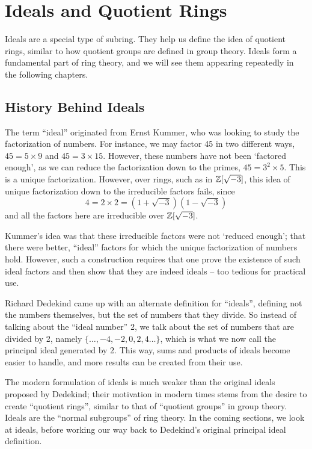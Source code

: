 \chapter{Ideals and Quotient Rings}
Ideals are a special type of subring. They help us define the idea of quotient rings, similar to how quotient groups are defined in group theory. Ideals form a fundamental part of ring theory, and we will see them appearing repeatedly in the following chapters.

\section{History Behind Ideals}
The term ``ideal'' originated from Ernst Kummer, who was looking to study the factorization of numbers. For instance, we may factor 45 in two different ways, $45 = 5 \times 9$ and $45 = 3 \times 15$. However, these numbers have not been `factored enough', as we can reduce the factorization down to the primes, $45 = 3^2 \times 5$. This is a unique factorization. However, over rings, such as in $\mathbb{Z}[\sqrt{-3}]$, this idea of unique factorization down to the irreducible factors fails, since
\[
    4 = 2 \times 2 = (1+\sqrt{-3})(1-\sqrt{-3})
\]
and all the factors here are irreducible over $\mathbb{Z}[\sqrt{-3}]$.

Kummer's idea was that these irreducible factors were not `reduced enough'; that there were better, ``ideal'' factors for which the unique factorization of numbers hold. However, such a construction requires that one prove the existence of such ideal factors and then show that they are indeed ideals -- too tedious for practical use.

Richard Dedekind came up with an alternate definition for ``ideals'', defining not the numbers themselves, but the set of numbers that they divide. So instead of talking about the ``ideal number'' 2, we talk about the set of numbers that are divided by 2, namely $\{\dots, -4, -2, 0, 2, 4 \dots\}$, which is what we now call the principal ideal generated by 2. This way, sums and products of ideals become easier to handle, and more results can be created from their use.

The modern formulation of ideals is much weaker than the original ideals proposed by Dedekind; their motivation in modern times stems from the desire to create ``quotient rings'', similar to that of ``quotient groups'' in group theory. Ideals are the ``normal subgroups'' of ring theory. In the coming sections, we look at ideals, before working our way back to Dedekind's original principal ideal definition.

